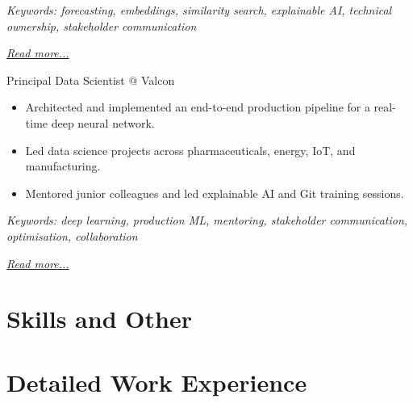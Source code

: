 \documentclass[11pt,a4paper]{moderncv}
\begin{document}
{\footnotesize\textit{Keywords: forecasting, embeddings, similarity search, explainable AI, technical ownership, stakeholder communication}}

\hfill{\small{\textit{\hyperref[sec:signum]{Read more...}}}}

\large{Principal Data Scientist @ Valcon}
\normalsize
\begin{itemize}
    \item Architected and implemented an end-to-end production pipeline for a real-time deep neural network.
    \item Led data science projects across pharmaceuticals, energy, IoT, and manufacturing.
    \item Mentored junior colleagues and led explainable AI and Git training sessions.
\end{itemize}

{\footnotesize\textit{Keywords: deep learning, production ML, mentoring, stakeholder communication, optimisation, collaboration}}

\hfill{\small{\textit{\hyperref[sec:valcon]{Read more...}}}}

\section{Skills and Other}
\normalsize
{}

\newpage

\section{Detailed Work Experience}
\end{document}
